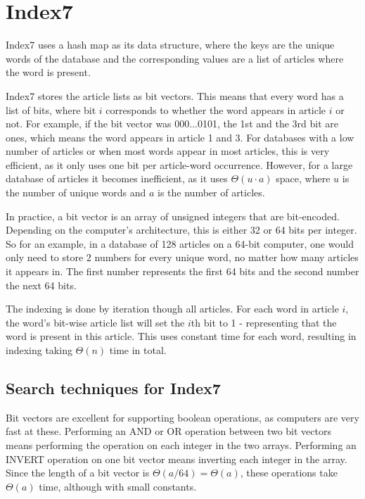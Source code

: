 \section{Index7}
Index7 uses a hash map as its data structure, where the keys are the unique words of the database and the corresponding values are a list of articles where the word is present. 

Index7 stores the article lists as bit vectors. This means that every word has a list of bits, where bit $i$ corresponds to whether the word appears in article $i$ or not. For example, if the bit vector was 000...0101, the 1st and the 3rd bit are ones, which means the word appears in article 1 and 3. For databases with a low number of articles or when most words appear in most articles, this is very efficient, as it only uses one bit per article-word occurrence. However, for a large database of articles it becomes inefficient, as it uses $\Theta(u\cdot a)$ space, where $u$ is the number of unique words and $a$ is the number of articles. 

In practice, a bit vector is an array of unsigned integers that are bit-encoded. Depending on the computer's architecture, this is either 32 or 64 bits per integer. So for an example, in a database of 128 articles on a 64-bit computer, one would only need to store 2 numbers for every unique word, no matter how many articles it appears in. The first number represents the first 64 bits and the second number the next 64 bits. 

The indexing is done by iteration though all articles. For each word in article $i$, the word's bit-wise article list will set the $i$th bit to 1 - representing that the word is present in this article. This uses constant time for each word, resulting in indexing taking $\Theta(n)$ time in total. 

\subsection{Search techniques for Index7}
Bit vectors are excellent for supporting boolean operations, as computers are very fast at these. Performing an AND or OR operation between two bit vectors means performing the operation on each integer in the two arrays. Performing an INVERT operation on one bit vector means inverting each integer in the array. Since the length of a bit vector is $\Theta(a/64) = \Theta(a)$, these operations take $\Theta(a)$ time, although with small constants. 

